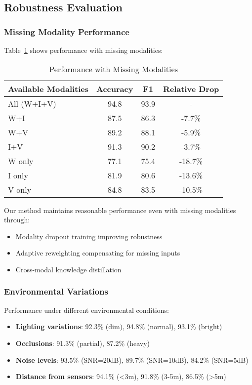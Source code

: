 \documentclass[journal]{IEEEtran}
\begin{document}
\subsection{Robustness Evaluation}

\subsubsection{Missing Modality Performance}

Table~\ref{tab:missing_modality} shows performance with missing modalities:

\begin{table}[t]
\centering
\caption{Performance with Missing Modalities}
\label{tab:missing_modality}
\begin{tabular}{lccc}
\toprule
Available Modalities & Accuracy & F1 & Relative Drop \\
\midrule
All (W+I+V) & 94.8 & 93.9 & - \\
\midrule
W+I & 87.5 & 86.3 & -7.7\% \\
W+V & 89.2 & 88.1 & -5.9\% \\
I+V & 91.3 & 90.2 & -3.7\% \\
\midrule
W only & 77.1 & 75.4 & -18.7\% \\
I only & 81.9 & 80.6 & -13.6\% \\
V only & 84.8 & 83.5 & -10.5\% \\
\bottomrule
\end{tabular}
\end{table}

Our method maintains reasonable performance even with missing modalities through:
\begin{itemize}
\item Modality dropout training improving robustness
\item Adaptive reweighting compensating for missing inputs
\item Cross-modal knowledge distillation
\end{itemize}

\subsubsection{Environmental Variations}

Performance under different environmental conditions:

\begin{itemize}
\item \textbf{Lighting variations}: 92.3\% (dim), 94.8\% (normal), 93.1\% (bright)
\item \textbf{Occlusions}: 91.3\% (partial), 87.2\% (heavy)
\item \textbf{Noise levels}: 93.5\% (SNR=20dB), 89.7\% (SNR=10dB), 84.2\% (SNR=5dB)
\item \textbf{Distance from sensors}: 94.1\% (<3m), 91.8\% (3-5m), 86.5\% (>5m)
\end{itemize}
\end{document}
